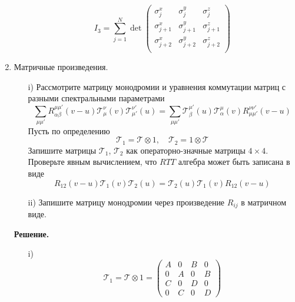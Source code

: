 \documentclass[12pt]{article}
\theoremstyle{definition}
\begin{document}
\begin{enumerate}
\begin{itemize}
\begin{equation}
            \boxed{I_3=\sum\limits_{j=1}^N\det\begin{pmatrix}
                \sigma^x_j & \sigma^y_j & \sigma^z_j\\
                \sigma^x_{j+1} & \sigma^y_{j+1} & \sigma^z_{j+1}\\
                \sigma^x_{j+2} & \sigma^y_{j+2} & \sigma^z_{j+2}\\
            \end{pmatrix}}
        \end{equation}
    \end{itemize}
    \item Матричные произведения.
    \begin{itemize}
        \item[i)] Рассмотрите матрицу монодромии и уравнения коммутации матриц с разными спектральными параметрами
        \begin{equation}
            \sum\limits_{\mu\mu'}R^{\mu\mu'}_{\alpha\beta}(v-u)\mathcal{T}^\nu_\mu(v)\mathcal{T}^{\nu'}_{\mu'}(u)=\sum\limits_{\mu\mu'}\mathcal{T}^{\mu'}_\beta(u)\mathcal{T}^\mu_\alpha(v)R^{\nu\nu'}_{\mu\mu'}(v-u)
        \end{equation}
        Пусть по определению
        \begin{equation}
            \mathcal{T}_1=\mathcal{T}\otimes1,\quad \mathcal{T}_2=1\otimes\mathcal{T}
        \end{equation}
        Запишите матрицы $\mathcal{T}_1$, $\mathcal{T}_2$ как операторно-значные матрицы $4\times4$. Проверьте явным вычислением, что $RTT$ алгебра может быть записана в виде
        \begin{equation}
            R_{12}(v-u)\mathcal{T}_1(v)\mathcal{T}_2(u)=\mathcal{T}_2(u)\mathcal{T}_1(v)R_{12}(v-u)
        \end{equation}
        \item[ii)] Запишите матрицу монодромии через произведение $R_{ij}$ в матричном виде.
    \end{itemize}
    \textbf{Решение.}
    \begin{itemize}
        \item[i)]
        \begin{equation}
            \boxed{\mathcal{T}_1=\mathcal{T}\otimes1=\begin{pmatrix}
                A & 0 & B & 0\\
                0 & A & 0 & B\\
                C & 0 & D & 0\\
                0 & C & 0 & D

\end{pmatrix}}
\end{equation}
\end{itemize}
\end{enumerate}
\end{document}
